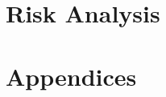 \documentclass[a4paper, 12pt]{article}
\begin{document}
\pagebreak


\section{Risk Analysis} %


\pagebreak



%
%
%
%
%
%







\section{Appendices} %


\pagebreak





{} %
\printbibliography
\pagebreak


\end{document}

